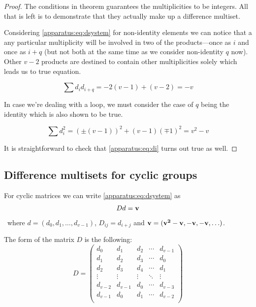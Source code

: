     \begin{proof}
        The conditions in theorem guarantees the multiplicities to be integers. All that is left is to demonstrate that they actually make up a difference multiset.
        
        Considering \eqref{apparatus:eq:dsystem} for non-identity elements we can notice that a any particular multiplicity will be involved in two of the products---once as $i$ and once as $i+q$ (but not both at the same time as we consider non-identity $q$ now). Other $v-2$ products are destined to contain other multiplicities solely which leads us to true equation.
        
        \begin{equation}
            \sum d_i d_{i+q} = -2(v-1) + (v-2) = -v
        \end{equation}

        In case we're dealing with a loop, we must consider the case of $q$ being the identity which is also shown to be true.
        
        \begin{equation}
            \sum d_i^2  = \left( \pm (v-1) \right)^2 + (v-1) \left( \mp 1 \right)^2 = v^2 - v
        \end{equation}
    
        It is straightforward to check that \eqref{apparatus:eq:di} turns out true as well.
    \end{proof}

\subsection{Difference multisets for cyclic groups}
    For cyclic matrices we can write \eqref{apparatus:eq:dsystem} as
    \begin{equation}
        D d = \bf v
    \end{equation}\
    where $d = (d_0, d_1, \ldots, d_{v-1})$, $D_{ij} = d_{i+j}$ and $\bf v = (v^2-v, -v, -v, \ldots)$.
    
    The form of the matrix $D$ is the following:
    \begin{equation}
        D =
        \begin{pmatrix}
            d_0 & d_1 & d_2 & \cdots & d_{v-1} \\ 
            d_1 & d_2 & d_3 & \cdots & d_0 \\
            d_2 & d_3 & d_4 & \cdots & d_1 \\
            \vdots & \vdots & \vdots & \ddots & \vdots \\
            d_{v-2} & d_{v-1} & d_0 & \cdots & d_{v-3} \\
            d_{v-1} & d_0 & d_1 & \cdots & d_{v-2} \\
        \end{pmatrix}
    \end{equation}
    
